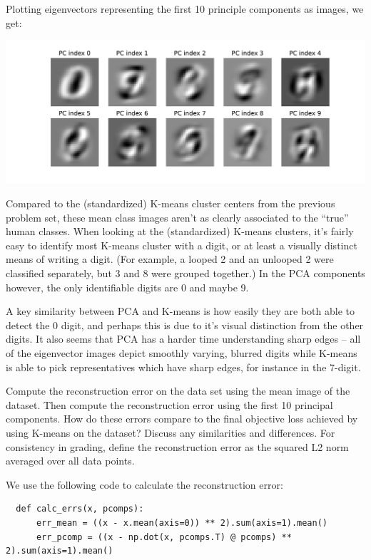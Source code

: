 \documentclass[expanded]{lkx_pset}
\begin{document}
\begin{parts}
	Plotting eigenvectors representing the first 10 principle components as images, we get:
	\begin{center}
		\includegraphics[scale=0.7]{figures/p3_pcomps.pdf}
	\end{center}
	Compared to the (standardized) K-means cluster centers from the previous problem set, these mean class images aren't as clearly associated to the ``true'' human classes. When looking at the (standardized) K-means clusters, it's fairly easy to identify most K-means cluster with a digit, or at least a visually distinct means of writing a digit. (For example, a looped 2 and an unlooped 2 were classified separately, but 3 and 8 were grouped together.) In the PCA components however, the only identifiable digits are 0 and maybe 9.

	A key similarity between PCA and K-means is how easily they are both able to detect the 0 digit, and perhaps this is due to it's visual distinction from the other digits. It also seems that PCA has a harder time understanding sharp edges -- all of the eigenvector images depict smoothly varying, blurred digits while K-means is able to pick representatives which have sharp edges, for instance in the 7-digit.

	\begin{part}{3} Compute the reconstruction error on the data set using the mean
		image of the dataset.  Then compute the reconstruction error using
		the first 10 principal components.  How do these errors compare to
		the final objective loss achieved by using K-means on the dataset?
		Discuss any similarities and differences. For consistency in grading, define the reconstruction error as the squared L2
		norm averaged over all data points.
	\end{part}

	We use the following code to calculate the reconstruction error:
	\begin{verbatim}
  def calc_errs(x, pcomps):
      err_mean = ((x - x.mean(axis=0)) ** 2).sum(axis=1).mean()
      err_pcomp = ((x - np.dot(x, pcomps.T) @ pcomps) ** 2).sum(axis=1).mean()
      

\end{verbatim}
\end{parts}
\end{document}
